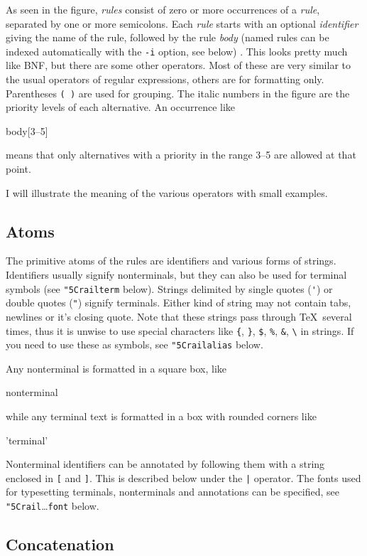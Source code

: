 \documentclass[a4paper]{article}
\newcommand\nt[1]{\textit{#1}}
\newcommand\lit[1]{\texttt{#1}}
\newcommand\cs[1]{\lit{\char"5C\relax#1}}
\begin{document}
As seen in the figure, \nt{rules} consist of zero or more occurrences of a
\nt{rule}, separated by one or more semicolons. Each \nt{rule}
starts with an optional \nt{identifier} giving the name of the rule,
followed by the rule \nt{body} (named rules can be indexed
automatically with the \lit{-i} option, see below) .
This looks pretty much like BNF, but
there are some other operators. Most of these are very similar to the usual
operators of regular expressions, others are for formatting only.
Parentheses \verb!( )! are used for grouping. The italic numbers in the
figure are the priority levels of each alternative. An occurrence like
\begin{rail}
body[3--5]
\end{rail}
means that only alternatives with a priority in the range 3--5 are
allowed at that point.

I will illustrate the meaning of the various operators with small
examples.

\subsection{Atoms}

The primitive atoms of the rules are identifiers and various forms of strings.
Identifiers usually signify nonterminals, but they can also be used for
terminal symbols (see \cs{railterm} below).
Strings delimited by single quotes (\verb!'!) or double quotes
(\verb!"!) signify terminals. Either kind of string may not contain
tabs, newlines or it's closing quote. Note that these
strings pass through \TeX\ several times, thus it is unwise to use
special characters like \verb!{!, \verb!}!, \verb!$!, \verb!%!,
\verb!&!, \verb!\! in strings.
If you need to use these as symbols, see \cs{railalias} below.

Any nonterminal is formatted in a square box, like
\begin{rail}
nonterminal
\end{rail}
while any terminal text is formatted in a box with rounded corners like
\begin{rail}
'terminal'
\end{rail}
Nonterminal identifiers can be annotated by following them with a string
enclosed in \verb![! and \verb!]!. This is described below under the
\verb!|! operator. The fonts used for typesetting terminals,
nonterminals and annotations can be specified,
see \cs{rail}\ldots\lit{font} below.

\subsection{Concatenation}
\end{document}
